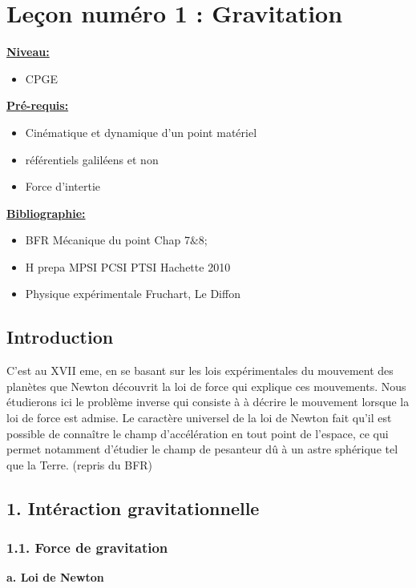 \documentclass[french, a4paper, 10pt, twocolumn, landscape]{article}
\begin{document}
\section*{Leçon numéro 1 : Gravitation}

\noindent\underline{\textbf{Niveau:}}
\begin{itemize}
  \item CPGE 
\end{itemize}
\underline{\textbf{Pr{\'e}-requis: }}

\begin{itemize}  
  \item Cinématique et dynamique d'un point matériel
  \item référentiels galiléens et non
  \item Force d'intertie
\end{itemize}
\underline{\textbf{Bibliographie:}}

\begin{itemize}
  \item BFR Mécanique du point Chap 7$\&$8;
  \item H prepa MPSI PCSI PTSI Hachette 2010
  \item Physique expérimentale Fruchart, Le Diffon
\end{itemize}


\subsection*{Introduction}

C’est au XVII eme, en se basant sur les lois expérimentales du mouvement des planètes que
Newton découvrit la loi de force qui explique ces mouvements. Nous étudierons ici le problème
inverse qui consiste à à décrire le mouvement lorsque la loi de force est admise. Le caractère
universel de la loi de Newton fait qu’il est possible de connaître le champ d’accélération en
tout point de l’espace, ce qui permet notamment d’étudier le champ de pesanteur dû à un astre
sphérique tel que la Terre. (repris du BFR)

\subsection*{1. Intéraction gravitationnelle}
\subsubsection*{1.1. Force de gravitation}

\textbf{a. Loi de Newton}
\end{document}

